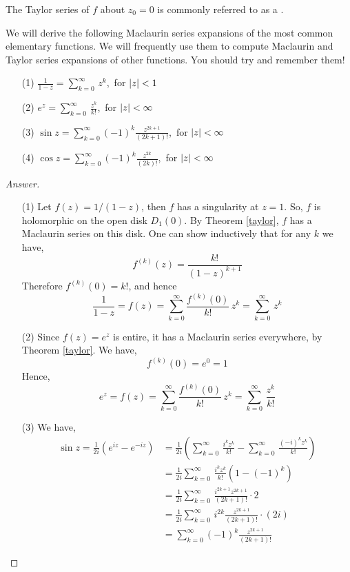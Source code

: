 The Taylor series of $f$ about $z_0 = 0$ is commonly referred to as a .
\begin{example}\label{macelseries}
We will derive the following Maclaurin series expansions of the most common elementary functions. We will frequently use them to compute Maclaurin and Taylor series expansions of other functions. You should try and remember them!
\begin{itemize}
\item[(1)] $\displaystyle\frac{1}{1 - z} = \sum_{k = 0}^\infty\,z^k$,\ for $\left\lvert z\right\rvert < 1$
\item[(2)] $\displaystyle e^z = \sum_{k = 0}^\infty\,\frac{z^k}{k!}$,\ for $\left\lvert z\right\rvert < \infty$
\item[(3)] $\displaystyle \sin z = \sum_{k = 0}^\infty(-1)^k\frac{z^{2k + 1}}{(2k + 1)!}$,\ for $\left\lvert z\right\rvert < \infty$
\item[(4)] $\displaystyle \cos z = \sum_{k = 0}^\infty(-1)^k\frac{z^{2k}}{(2k)!}$,\ for $\left\lvert z\right\rvert < \infty$
\end{itemize}
\begin{proof}[Answer]\hfill
\begin{itemize}
\item[(1)] Let $f(z) = 1/(1 - z)$, then $f$ has a singularity at $z = 1$. So, $f$ is holomorphic on the open disk $D_1(0)$. By Theorem \ref{taylor}, $f$ has a Maclaurin series on this disk. One can show inductively that for any $k$ we have,
\[f^{(k)}(z) = \frac{k!}{(1 - z)^{k+1}}\]
Therefore $f^{(k)}(0) = k!$, and hence
\[\frac{1}{1 - z} = f(z) = \sum_{k = 0}^\infty\frac{f^{(k)}(0)}{k!}\,z^k = \sum_{k = 0}^\infty\,z^k\]

\item[(2)] Since $f(z) = e^z$ is entire, it has a Maclaurin series everywhere, by Theorem \ref{taylor}. We have,
\[f^{(k)}(0) = e^0 = 1\]
Hence, 
\[e^z = f(z) = \sum_{k = 0}^\infty\frac{f^{(k)}(0)}{k!}\,z^k = \sum_{k = 0}^\infty\,\frac{z^k}{k!}\]

\item[(3)] We have,
\begin{align*}
\sin z = \frac{1}{2i}\left(e^{iz} - e^{-iz}\right) &= \frac{1}{2i}\left(\sum_{k = 0}^\infty\,\frac{i^kz^k}{k!} - \sum_{k = 0}^\infty\,\frac{(-i)^kz^k}{k!}\right)\\[1em]
 &= \frac{1}{2i}\sum_{k = 0}^\infty\,\frac{i^kz^k}{k!}\left(1 - (-1)^k\right)\\[1em]
 &= \frac{1}{2i}\sum_{k = 0}^\infty\,\frac{i^{2k+1}z^{2k+1}}{(2k+1)!}\cdot 2\\[1em]
 &= \frac{1}{2i}\sum_{k = 0}^\infty\,i^{2k}\frac{z^{2k+1}}{(2k+1)!}\cdot (2i)\\[1em]
 &= \sum_{k = 0}^\infty(-1)^{k}\frac{z^{2k+1}}{(2k+1)!}
\end{align*}


\end{itemize}
\end{proof}
\end{example}

